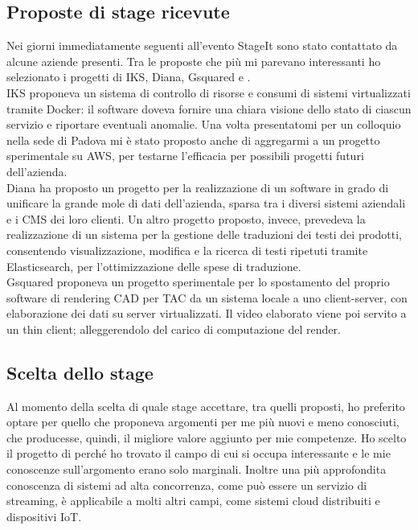   \subsection{Proposte di stage ricevute}
   Nei giorni immediatamente seguenti all'evento StageIt sono stato contattato da alcune aziende presenti. Tra le proposte che più mi parevano interessanti ho selezionato i progetti di IKS, Diana, Gsquared e \nomeAzienda{}.
   \\
   IKS proponeva un sistema di controllo di risorse e consumi di sistemi virtualizzati tramite \gls{Docker}: il software doveva fornire una chiara visione dello stato di ciascun servizio e riportare eventuali anomalie. Una volta presentatomi per un colloquio nella sede di Padova mi è stato proposto anche di aggregarmi a un progetto sperimentale su \gls{AWS}, per testarne l'efficacia per possibili progetti futuri dell'azienda.
   \\
   Diana ha proposto un progetto per la realizzazione di un software in grado di unificare la grande mole di dati dell'azienda, sparsa tra i diversi sistemi aziendali e i \gls{CMS} dei loro clienti. Un altro progetto proposto, invece, prevedeva la realizzazione di un sistema per la gestione delle traduzioni dei testi dei prodotti, consentendo visualizzazione, modifica e la ricerca di testi ripetuti tramite Elasticsearch, per l'ottimizzazione delle spese di traduzione.
   \\
   Gsquared proponeva un progetto sperimentale per lo spostamento del proprio software di rendering \gls{CAD} per \gls{TAC} da un sistema locale a uno client-server, con elaborazione dei dati su server virtualizzati. Il video elaborato viene poi servito a un \gls{thin client}; alleggerendolo del carico di computazione del render.
   
   \subsection{Scelta dello stage}
   Al momento della scelta di quale stage accettare, tra quelli proposti, ho preferito optare per quello che proponeva argomenti per me più nuovi e meno conosciuti, che producesse, quindi, il migliore valore aggiunto per mie competenze.
   Ho scelto il progetto di \nomeAzienda{} perché ho trovato il campo di cui si occupa interessante e le mie conoscenze sull'argomento erano solo marginali. Inoltre una più approfondita conoscenza di sistemi ad alta concorrenza, come può essere un servizio di streaming, è applicabile a molti altri campi, come sistemi cloud distribuiti e dispositivi IoT.

